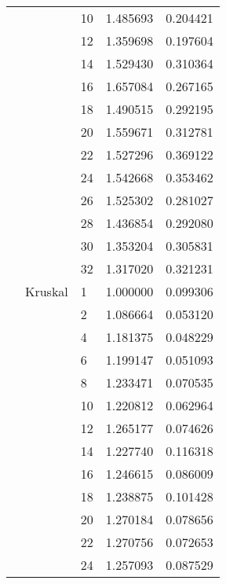 \begin{tabular}{lllrr}
                      &            & 10 &  1.485693 &  0.204421 \\
                      &            & 12 &  1.359698 &  0.197604 \\
                      &            & 14 &  1.529430 &  0.310364 \\
                      &            & 16 &  1.657084 &  0.267165 \\
                      &            & 18 &  1.490515 &  0.292195 \\
                      &            & 20 &  1.559671 &  0.312781 \\
                      &            & 22 &  1.527296 &  0.369122 \\
                      &            & 24 &  1.542668 &  0.353462 \\
                      &            & 26 &  1.525302 &  0.281027 \\
                      &            & 28 &  1.436854 &  0.292080 \\
                      &            & 30 &  1.353204 &  0.305831 \\
                      &            & 32 &  1.317020 &  0.321231 \\
                      & Kruskal & 1  &  1.000000 &  0.099306 \\
                      &            & 2  &  1.086664 &  0.053120 \\
                      &            & 4  &  1.181375 &  0.048229 \\
                      &            & 6  &  1.199147 &  0.051093 \\
                      &            & 8  &  1.233471 &  0.070535 \\
                      &            & 10 &  1.220812 &  0.062964 \\
                      &            & 12 &  1.265177 &  0.074626 \\
                      &            & 14 &  1.227740 &  0.116318 \\
                      &            & 16 &  1.246615 &  0.086009 \\
                      &            & 18 &  1.238875 &  0.101428 \\
                      &            & 20 &  1.270184 &  0.078656 \\
                      &            & 22 &  1.270756 &  0.072653 \\
                      &            & 24 &  1.257093 &  0.087529 \\

\end{tabular}
